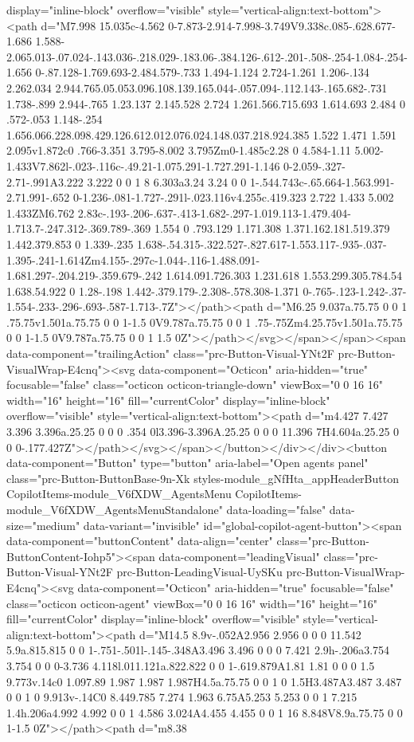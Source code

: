display="inline-block" overflow="visible" style="vertical-align:text-bottom"><path d="M7.998 15.035c-4.562 0-7.873-2.914-7.998-3.749V9.338c.085-.628.677-1.686 1.588-2.065.013-.07.024-.143.036-.218.029-.183.06-.384.126-.612-.201-.508-.254-1.084-.254-1.656 0-.87.128-1.769.693-2.484.579-.733 1.494-1.124 2.724-1.261 1.206-.134 2.262.034 2.944.765.05.053.096.108.139.165.044-.057.094-.112.143-.165.682-.731 1.738-.899 2.944-.765 1.23.137 2.145.528 2.724 1.261.566.715.693 1.614.693 2.484 0 .572-.053 1.148-.254 1.656.066.228.098.429.126.612.012.076.024.148.037.218.924.385 1.522 1.471 1.591 2.095v1.872c0 .766-3.351 3.795-8.002 3.795Zm0-1.485c2.28 0 4.584-1.11 5.002-1.433V7.862l-.023-.116c-.49.21-1.075.291-1.727.291-1.146 0-2.059-.327-2.71-.991A3.222 3.222 0 0 1 8 6.303a3.24 3.24 0 0 1-.544.743c-.65.664-1.563.991-2.71.991-.652 0-1.236-.081-1.727-.291l-.023.116v4.255c.419.323 2.722 1.433 5.002 1.433ZM6.762 2.83c-.193-.206-.637-.413-1.682-.297-1.019.113-1.479.404-1.713.7-.247.312-.369.789-.369 1.554 0 .793.129 1.171.308 1.371.162.181.519.379 1.442.379.853 0 1.339-.235 1.638-.54.315-.322.527-.827.617-1.553.117-.935-.037-1.395-.241-1.614Zm4.155-.297c-1.044-.116-1.488.091-1.681.297-.204.219-.359.679-.242 1.614.091.726.303 1.231.618 1.553.299.305.784.54 1.638.54.922 0 1.28-.198 1.442-.379.179-.2.308-.578.308-1.371 0-.765-.123-1.242-.37-1.554-.233-.296-.693-.587-1.713-.7Z"></path><path d="M6.25 9.037a.75.75 0 0 1 .75.75v1.501a.75.75 0 0 1-1.5 0V9.787a.75.75 0 0 1 .75-.75Zm4.25.75v1.501a.75.75 0 0 1-1.5 0V9.787a.75.75 0 0 1 1.5 0Z"></path></svg></span></span><span data-component="trailingAction" class="prc-Button-Visual-YNt2F prc-Button-VisualWrap-E4cnq"><svg data-component="Octicon" aria-hidden="true" focusable="false" class="octicon octicon-triangle-down" viewBox="0 0 16 16" width="16" height="16" fill="currentColor" display="inline-block" overflow="visible" style="vertical-align:text-bottom"><path d="m4.427 7.427 3.396 3.396a.25.25 0 0 0 .354 0l3.396-3.396A.25.25 0 0 0 11.396 7H4.604a.25.25 0 0 0-.177.427Z"></path></svg></span></button></div></div><button data-component="Button" type="button" aria-label="Open agents panel" class="prc-Button-ButtonBase-9n-Xk styles-module_gNfHta_appHeaderButton CopilotItems-module_V6fXDW_AgentsMenu CopilotItems-module_V6fXDW_AgentsMenuStandalone" data-loading="false" data-size="medium" data-variant="invisible" id="global-copilot-agent-button"><span data-component="buttonContent" data-align="center" class="prc-Button-ButtonContent-Iohp5"><span data-component="leadingVisual" class="prc-Button-Visual-YNt2F prc-Button-LeadingVisual-UySKu prc-Button-VisualWrap-E4cnq"><svg data-component="Octicon" aria-hidden="true" focusable="false" class="octicon octicon-agent" viewBox="0 0 16 16" width="16" height="16" fill="currentColor" display="inline-block" overflow="visible" style="vertical-align:text-bottom"><path d="M14.5 8.9v-.052A2.956 2.956 0 0 0 11.542 5.9a.815.815 0 0 1-.751-.501l-.145-.348A3.496 3.496 0 0 0 7.421 2.9h-.206a3.754 3.754 0 0 0-3.736 4.118l.011.121a.822.822 0 0 1-.619.879A1.81 1.81 0 0 0 1.5 9.773v.14c0 1.097.89 1.987 1.987 1.987H4.5a.75.75 0 0 1 0 1.5H3.487A3.487 3.487 0 0 1 0 9.913v-.14C0 8.449.785 7.274 1.963 6.75A5.253 5.253 0 0 1 7.215 1.4h.206a4.992 4.992 0 0 1 4.586 3.024A4.455 4.455 0 0 1 16 8.848V8.9a.75.75 0 0 1-1.5 0Z"></path><path d="m8.38 